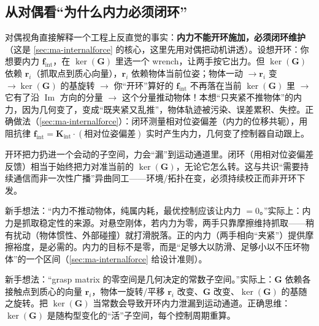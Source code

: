 \subsection{从对偶看“为什么内力必须闭环”}
\label{sec:ma-why-closedloop}

对偶视角直接解释一个工程上反直觉的事实：\textbf{内力不能开环施加，必须闭环维护}（这是 \cref{sec:ma-internalforce} 的核心，这里先用对偶把动机讲透）。设想开环：你想要内力 $\mathbf{f}_{\text{int}}$，在 $\ker(\mathbf{G})$ 里选一个 wrench，让两手按它出力。但 $\ker(\mathbf{G})$ 依赖 $\mathbf{r}_i$（抓取点到质心向量），$\mathbf{r}_i$ 依赖物体当前位姿；物体一动 $\to\mathbf{r}_i$ 变 $\to\ker(\mathbf{G})$ 的基旋转 $\to$ 你“开环”算好的 $\mathbf{f}_{\text{int}}$ 不再落在当前 $\ker(\mathbf{G})$ 里 $\to$ 它有了沿 $\operatorname{Im}$ 方向的分量 $\to$ 这个分量推动物体！本想“只夹紧不推物体”的内力，因为几何变了，变成“既夹紧又乱推”，物体轨迹被污染、误差累积、失控。正确做法（\cref{sec:ma-internalforce}）：闭环测量相对位姿偏差（内力的位移共轭），用阻抗律 $\mathbf{f}_{\text{int}}=\mathbf{K}_{\text{int}}\cdot(\text{相对位姿偏差})$ 实时产生内力，几何变了控制器自动跟上。

\begin{insight}
开环把力扔进一个会动的子空间，力会“漏”到运动通道里。闭环（用相对位姿偏差反馈）相当于始终把力对准当前的 $\ker(\mathbf{G})$，无论它怎么转。这与共识“需要持续通信而非一次性广播”异曲同工——环境/拓扑在变，必须持续校正而非开环下发。
\end{insight}

\begin{pitfall}
新手想法：“内力不推动物体，纯属内耗，最优控制应该让内力 $=0$。”实际上：内力是抓取稳定性的来源。对悬空刚体，若内力为零，两手只靠摩擦维持抓取——稍有扰动（物体惯性、外部碰撞）就打滑脱落。正的内力（两手相向“夹紧”）提供摩擦裕度，是必需的。内力的目标不是零，而是“足够大以防滑、足够小以不压坏物体”的一个区间（\cref{sec:ma-internalforce} 给设计准则）。
\end{pitfall}

\begin{pitfall}
新手想法：“grasp matrix 的零空间是几何决定的常数子空间。”实际上：$\mathbf{G}$ 依赖各接触点到质心的向量 $\mathbf{r}_i$，物体一旋转/平移 $\mathbf{r}_i$ 改变、$\mathbf{G}$ 改变、$\ker(\mathbf{G})$ 的基随之旋转。把 $\ker(\mathbf{G})$ 当常数会导致开环内力泄漏到运动通道。正确思维：$\ker(\mathbf{G})$ 是随构型变化的“活”子空间，每个控制周期重算。
\end{pitfall}

